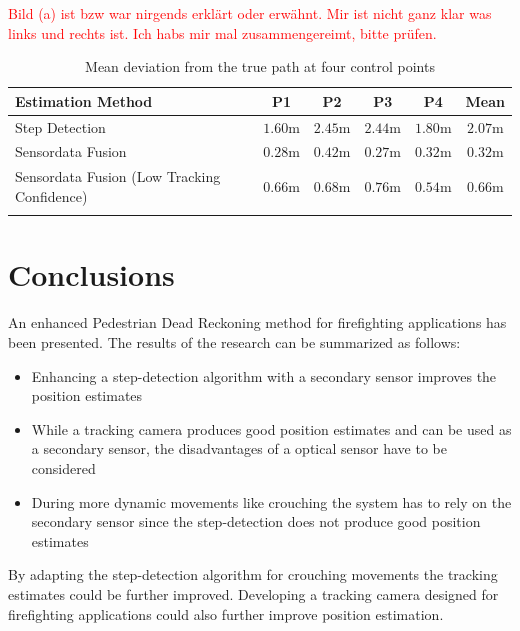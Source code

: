 \documentclass[engproc,conferenceproceedings,submit,pdftex,moreauthors]{Definitions/mdpi}
\begin{document}
\textcolor{red}{Bild (a) ist bzw war nirgends erklärt oder erwähnt. Mir ist nicht ganz klar was links und rechts ist. Ich habs mir mal zusammengereimt, bitte prüfen.}

\begin{table}[H] 
\caption{Mean deviation from the true path at four control points\label{tab1}}
\begin{tabularx}{\textwidth}{lccccc}
\toprule
\textbf{Estimation Method}	& \textbf{P1}	& \textbf{P2} & \textbf{P3} & \textbf{P4} & \textbf{Mean}\\
\midrule
Step Detection	&    $1.60\mathrm{m}$ &   $2.45\mathrm{m}$ &   $2.44\mathrm{m}$  &  $1.80\mathrm{m}$ & $2.07\mathrm{m}$ \\
Sensordata Fusion  &  $0.28\mathrm{m}$  &  $0.42\mathrm{m}$  &  $0.27\mathrm{m}$ &   $0.32\mathrm{m}$ & $0.32\mathrm{m}$ \\
Sensordata Fusion (Low Tracking Confidence) &    $0.66\mathrm{m}$ &   $0.68\mathrm{m}$  &  $0.76\mathrm{m}$  &  $0.54\mathrm{m}$ & $0.66\mathrm{m}$\\
\bottomrule\\
\end{tabularx}



\end{table}






\section{Conclusions}

An enhanced Pedestrian Dead Reckoning method for firefighting applications has been presented. The results of the research can be summarized as follows:
\begin{itemize}
	\item Enhancing a step-detection algorithm with a secondary sensor improves the position estimates
	\item While a tracking camera produces good position estimates and can be used as a secondary sensor, the disadvantages of a optical sensor have to be considered
	\item During more dynamic movements like crouching the system has to rely on the secondary sensor since the step-detection does not produce good position estimates
\end{itemize}
By adapting the step-detection algorithm for crouching movements the tracking estimates could be further improved. Developing a tracking camera designed for firefighting applications could also further improve position estimation.
%
\end{document}
